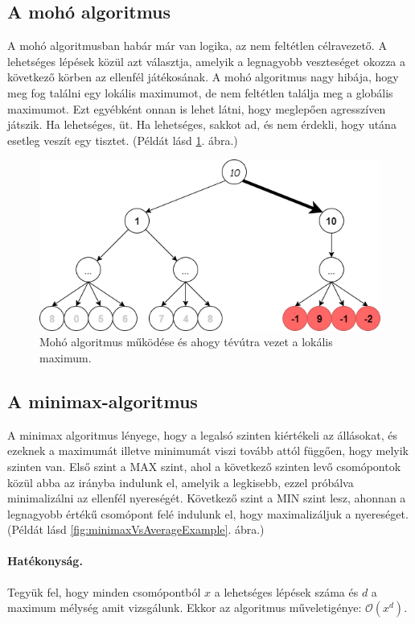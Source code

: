 \documentclass[twoside, a4paper, 12pt]{article}
\begin{document}
\subsection{A mohó algoritmus}
A mohó algoritmusban habár már van logika, az nem feltétlen célravezető. A lehetséges lépések közül azt választja, amelyik a legnagyobb veszteséget okozza a következő körben az ellenfél játékosának. A mohó algoritmus nagy hibája, hogy meg fog találni egy lokális maximumot, de nem feltétlen találja meg a globális maximumot. Ezt egyébként onnan is lehet látni, hogy meglepően agresszíven játszik. Ha lehetséges, üt. Ha lehetséges, sakkot ad, és nem érdekli, hogy utána esetleg veszít egy tisztet.
(Példát lásd \ref{fig:greedyAlgorithmExampleDangerous}. ábra.)
\begin{figure}[htbp]
	\centering
	\includegraphics[width=\textwidth]{img/greedyAlgorithmExampleDangerous.png}
	\caption{Mohó algoritmus működése és ahogy tévútra vezet a lokális maximum.}
	\label{fig:greedyAlgorithmExampleDangerous}
\end{figure}

\subsection{A minimax-algoritmus}
A minimax algoritmus lényege, hogy a legalsó szinten kiértékeli az állásokat, és ezeknek a maximumát illetve minimumát viszi tovább attól függően, hogy melyik szinten van. Első szint a MAX szint, ahol a következő szinten levő csomópontok közül abba az irányba indulunk el, amelyik a legkisebb, ezzel próbálva minimalizálni az ellenfél nyereségét. Következő szint a MIN szint lesz, ahonnan a legnagyobb értékű csomópont felé indulunk el, hogy maximalizáljuk a nyereséget. (Példát lásd \ref{fig:minimaxVsAverageExample}. ábra.)\cite{bevMiHu}
\paragraph{Hatékonyság.} Tegyük fel, hogy minden csomópontból $x$ a lehetséges lépések száma és $d$ a maximum mélység amit vizsgálunk. Ekkor az algoritmus műveletigénye: $ \mathcal{O}(x^d)$.
\end{document}
